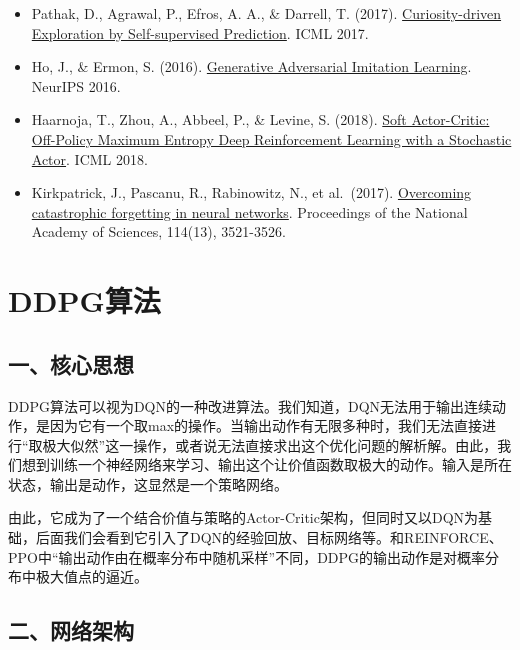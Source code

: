 \begin{itemize}
\tightlist
\item
  Pathak, D., Agrawal, P., Efros, A. A., \& Darrell, T. (2017). \href{https://arxiv.org/abs/1705.05363}{Curiosity-driven Exploration by Self-supervised Prediction}. ICML 2017.
\item
  Ho, J., \& Ermon, S. (2016). \href{https://proceedings.neurips.cc/paper/2016/hash/cc7e2b878868cbae992d1fb743995d8f-Abstract.html}{Generative Adversarial Imitation Learning}. NeurIPS 2016.
\item
  Haarnoja, T., Zhou, A., Abbeel, P., \& Levine, S. (2018). \href{https://arxiv.org/abs/1801.01290}{Soft Actor-Critic: Off-Policy Maximum Entropy Deep Reinforcement Learning with a Stochastic Actor}. ICML 2018.
\item
  Kirkpatrick, J., Pascanu, R., Rabinowitz, N., et al.~(2017). \href{https://doi.org/10.1073/pnas.1611835114}{Overcoming catastrophic forgetting in neural networks}. Proceedings of the National Academy of Sciences, 114(13), 3521-3526.
\end{itemize}

\clearpage

\hypertarget{ddpgux7b97ux6cd5}{%
\section{DDPG算法}\label{ddpgux7b97ux6cd5}}

\hypertarget{ux4e00ux6838ux5fc3ux601dux60f3-3}{%
\subsection{一、核心思想}\label{ux4e00ux6838ux5fc3ux601dux60f3-3}}

DDPG算法可以视为DQN的一种改进算法。我们知道，DQN无法用于输出连续动作，是因为它有一个取max的操作。当输出动作有无限多种时，我们无法直接进行``取极大似然''这一操作，或者说无法直接求出这个优化问题的解析解。由此，我们想到训练一个神经网络来学习、输出这个让价值函数取极大的动作。输入是所在状态，输出是动作，这显然是一个策略网络。

由此，它成为了一个结合价值与策略的Actor-Critic架构，但同时又以DQN为基础，后面我们会看到它引入了DQN的经验回放、目标网络等。和REINFORCE、PPO中``输出动作由在概率分布中随机采样''不同，DDPG的输出动作是对概率分布中极大值点的逼近。

\hypertarget{ux4e8cux7f51ux7edcux67b6ux6784}{%
\subsection{二、网络架构}\label{ux4e8cux7f51ux7edcux67b6ux6784}}

